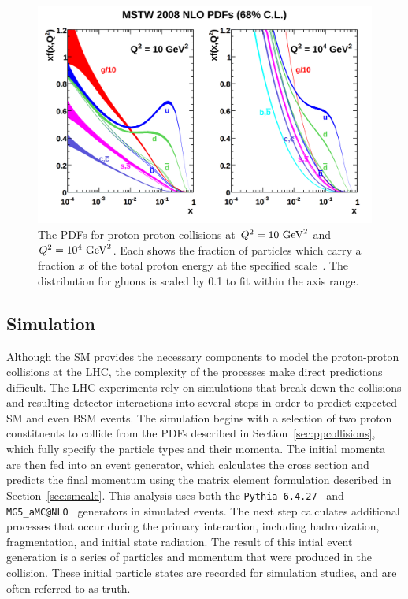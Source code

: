 \begin{figure}
\includegraphics[width=\textwidth]{figures/pdfs.png}
\caption{The \acsp*{PDF} for proton-proton collisions at $Q^2 = 10\ \mathrm{Ge\kern -0.05em V}^{2}$ and $Q^2 = 10^4\ \mathrm{Ge\kern -0.05em V}^{2}$. Each shows the fraction of particles which carry a fraction $x$ of the total proton energy at the specified scale~\cite{pdfs}. The distribution for gluons is scaled by 0.1 to fit within the axis range.}
\label{fig:pdfs}
\end{figure}

\subsection{Simulation}

Although the \ac{SM} provides the necessary components to model the proton-proton collisions at the \ac{LHC}, the complexity of the processes make direct predictions difficult.
The \ac{LHC} experiments rely on simulations that break down the collisions and resulting detector interactions into several steps in order to predict expected \ac{SM} and even \ac{BSM} events.
The simulation begins with a selection of two proton constituents to collide from the \acp{PDF} described in Section~\ref{sec:ppcollisions}, which fully specify the particle types and their momenta.
The initial momenta are then fed into an event generator, which calculates the cross section and predicts the final momentum using the matrix element formulation described in Section~\ref{sec:smcalc}.
This analysis uses both the \texttt{Pythia 6.4.27}~\cite{pythia6} and \texttt{MG5\_aMC@NLO}~\cite{madgraph} generators in simulated events.
The next step calculates additional processes that occur during the primary interaction, including hadronization, fragmentation, and initial state radiation. 
The result of this intial event generation is a series of particles and momentum that were produced in the collision.
These initial particle states are recorded for simulation studies, and are often referred to as truth.

